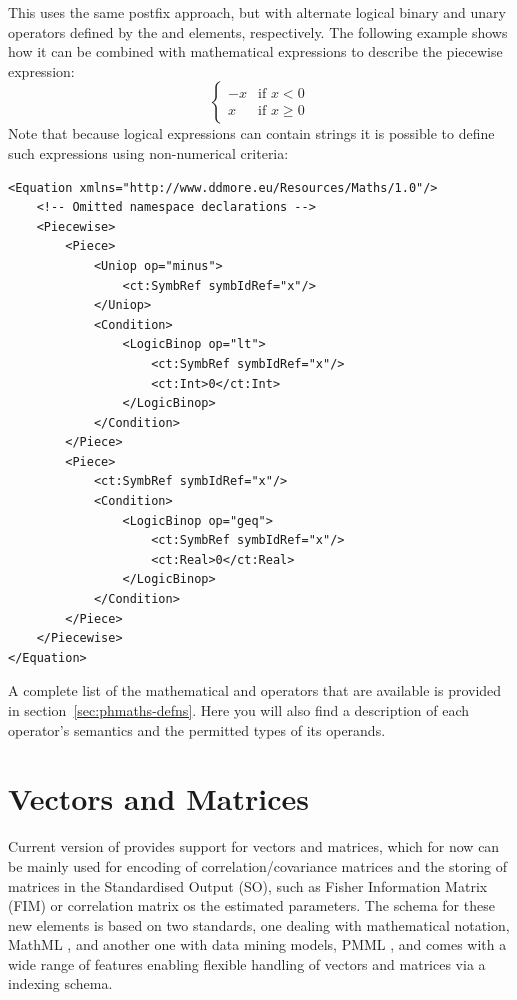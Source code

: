 This uses the same postfix approach, but with alternate logical binary
and unary operators defined by the  and
 elements, respectively. The following example shows
how it can be combined with mathematical expressions to describe the
piecewise expression:
%
\[
\begin{cases}
-x & \text{if } x < 0\\
 x & \text{if } x \geq 0
\end{cases}
\]
%
Note that because logical expressions can contain strings it is
possible to define such expressions using non-numerical criteria:
%
\lstset{language=XML}
\begin{lstlisting}
<Equation xmlns="http://www.ddmore.eu/Resources/Maths/1.0"/>
    <!-- Omitted namespace declarations -->
    <Piecewise>
        <Piece>
            <Uniop op="minus">
                <ct:SymbRef symbIdRef="x"/>
            </Uniop>
            <Condition>
                <LogicBinop op="lt">
                    <ct:SymbRef symbIdRef="x"/>
                    <ct:Int>0</ct:Int>
                </LogicBinop>
            </Condition>
        </Piece>
        <Piece>
            <ct:SymbRef symbIdRef="x"/>
            <Condition>
                <LogicBinop op="geq">
                    <ct:SymbRef symbIdRef="x"/>
                    <ct:Real>0</ct:Real>
                </LogicBinop>
            </Condition>
        </Piece>
    </Piecewise>
</Equation>
\end{lstlisting}
%
A complete list of the mathematical and operators that are available
is provided in section~\ref{sec:phmaths-defns}.  Here you will also
find a description of each operator's semantics and the permitted types
of its operands.

\section{Vectors and Matrices}
\label{sec:vectorsAndMatrices}
Current version of \pharmml provides support for vectors and matrices, which for 
now can be mainly used for encoding of correlation/covariance matrices and the storing of
matrices in the Standardised Output (SO), such as Fisher Information Matrix (FIM)
or correlation matrix os the estimated parameters.
The schema for these new elements is based on two standards, one dealing with 
mathematical notation, MathML \cite{mathml3:2010}, 
and another one with data mining models, PMML \cite{pmml:2014}, and comes with 
a wide range of features enabling flexible handling of vectors and matrices via a 
indexing schema.

